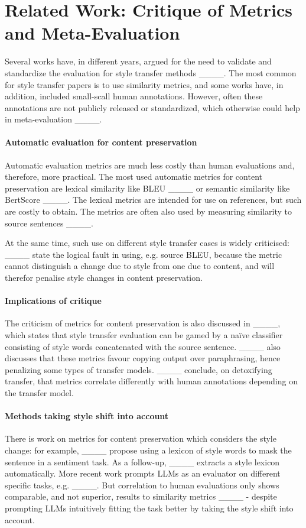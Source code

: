 \section{Related Work: Critique of Metrics and Meta-Evaluation}
\label{sec:relatedwork}
Several works have, in different years, argued for the need to validate and standardize the evaluation for style transfer methods ____. The most common for style transfer papers is to use similarity metrics, and some works have, in addition, included small-scall human annotations. However, often these annotations are not publicly released or standardized, which otherwise could help in meta-evaluation  ____.  

\paragraph{Automatic evaluation for content preservation}
Automatic evaluation metrics are much less costly than human evaluations and, therefore, more practical. The most used automatic metrics for content preservation are lexical similarity like BLEU ____ or semantic similarity like BertScore ____. The lexical metrics are intended for use on references, but such are costly to obtain. The metrics are often also used by measuring similarity to source sentences ____. 

At the same time, such use on different style transfer cases is widely criticised:  ____  state the logical fault in using, e.g. source BLEU, because the metric cannot distinguish a change due to style from one due to content, and will therefor penalise style changes in content preservation.

\paragraph{Implications of critique}
The criticism of metrics for content preservation is also discussed in ____, which states that style transfer evaluation can be gamed by a naïve classifier consisting of style words concatenated with the source sentence. ____  also discusses that these metrics favour copying output over paraphrasing, hence penalizing some types of transfer models.  ____ conclude, on detoxifying transfer, that metrics correlate differently with human annotations depending on the transfer model. 

\paragraph{Methods taking style shift into account}
There is work on metrics for content preservation which considers the style change: for example, ____ propose using a lexicon of style words to mask the sentence in a sentiment task. As a follow-up,  ____ extracts a style lexicon automatically. More recent work prompts LLMs as an evaluator on different specific tasks, e.g. ____. But correlation to human evaluations only shows comparable, and not superior, results to similarity metrics ____ - despite prompting LLMs intuitively fitting the task better by taking the style shift into account. 


